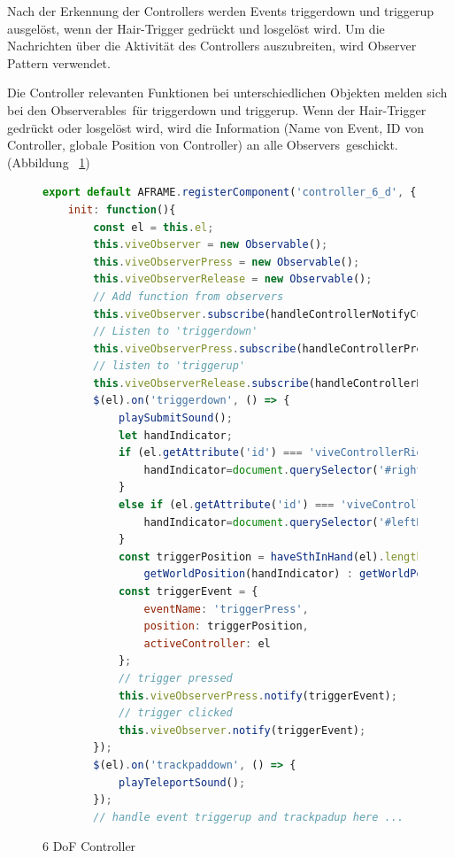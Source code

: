   Nach der Erkennung der Controllers werden Events {\selectfont triggerdown} und {\selectfont triggerup} ausgelöst, wenn der Hair-Trigger gedrückt und losgelöst wird. Um die Nachrichten über die Aktivität des Controllers auszubreiten, wird Observer Pattern verwendet.
  
  Die Controller relevanten Funktionen bei unterschiedlichen Objekten melden sich bei den \glqq Observerables\grqq\ für {\selectfont triggerdown} und {\selectfont triggerup}. Wenn der Hair-Trigger gedrückt oder losgelöst wird, wird die Information (Name von Event, ID von Controller, globale Position von Controller) an alle \glqq Observers\grqq\ geschickt. (Abbildung ~\ref{fig:controller6D})
  
\begin{figure}[ht]
\vspace*{1em}
\centering
\caption[6 DoF Controller]{6 DoF Controller}
\begin{lstlisting}[language=JavaScript, style=htmlcssjs]
export default AFRAME.registerComponent('controller_6_d', {
    init: function(){
        const el = this.el;
        this.viveObserver = new Observable();
        this.viveObserverPress = new Observable();
        this.viveObserverRelease = new Observable();
        // Add function from observers
        this.viveObserver.subscribe(handleControllerNotifyCupboardDoor);
        // Listen to 'triggerdown'
        this.viveObserverPress.subscribe(handleControllerPressPortfolio);
        // listen to 'triggerup'
        this.viveObserverRelease.subscribe(handleControllerReleaseControllerHand);
        $(el).on('triggerdown', () => {
            playSubmitSound();
            let handIndicator;
            if (el.getAttribute('id') === 'viveControllerRight') {
                handIndicator=document.querySelector('#rightHandIndicator');
            }
            else if (el.getAttribute('id') === 'viveControllerLeft') {
                handIndicator=document.querySelector('#leftHandIndicator');
            }
            const triggerPosition = haveSthInHand(el).length > 0 ?
                getWorldPosition(handIndicator) : getWorldPosition(el);
            const triggerEvent = {
                eventName: 'triggerPress',
                position: triggerPosition,
                activeController: el
            };
            // trigger pressed
            this.viveObserverPress.notify(triggerEvent);
            // trigger clicked
            this.viveObserver.notify(triggerEvent);
        });
        $(el).on('trackpaddown', () => {
            playTeleportSound();
        });
        // handle event triggerup and trackpadup here ...
\end{lstlisting}
\label{fig:controller6D} 
\end{figure}
  
